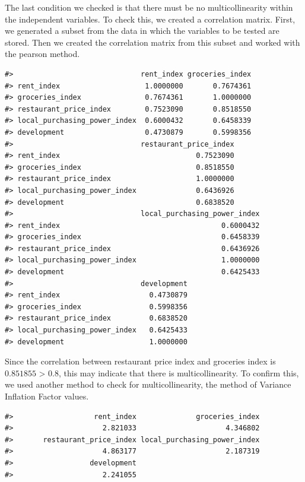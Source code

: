 \documentclass[
  11pt,
  a4paper,
  twoside]{scrbook}
\begin{document}
The last condition we checked is that there must be no multicollinearity within the independent variables.
To check this, we created a correlation matrix. First, we generated a subset from the data in which the variables to be tested are stored. Then we created the correlation matrix from this subset and worked with the pearson method.

\begin{verbatim}
#>                              rent_index groceries_index
#> rent_index                    1.0000000       0.7674361
#> groceries_index               0.7674361       1.0000000
#> restaurant_price_index        0.7523090       0.8518550
#> local_purchasing_power_index  0.6000432       0.6458339
#> development                   0.4730879       0.5998356
#>                              restaurant_price_index
#> rent_index                                0.7523090
#> groceries_index                           0.8518550
#> restaurant_price_index                    1.0000000
#> local_purchasing_power_index              0.6436926
#> development                               0.6838520
#>                              local_purchasing_power_index
#> rent_index                                      0.6000432
#> groceries_index                                 0.6458339
#> restaurant_price_index                          0.6436926
#> local_purchasing_power_index                    1.0000000
#> development                                     0.6425433
#>                              development
#> rent_index                     0.4730879
#> groceries_index                0.5998356
#> restaurant_price_index         0.6838520
#> local_purchasing_power_index   0.6425433
#> development                    1.0000000
\end{verbatim}

Since the correlation between restaurant price index and groceries index is
\(0.851855\) \textgreater{} 0.8, this may indicate that there is multicollinearity. To confirm this, we used another method to check for multicollinearity, the method of Variance Inflation Factor values.

\begin{verbatim}
#>                   rent_index              groceries_index 
#>                     2.821033                     4.346802 
#>       restaurant_price_index local_purchasing_power_index 
#>                     4.863177                     2.187319 
#>                  development 
#>                     2.241055
\end{verbatim}
\end{document}

